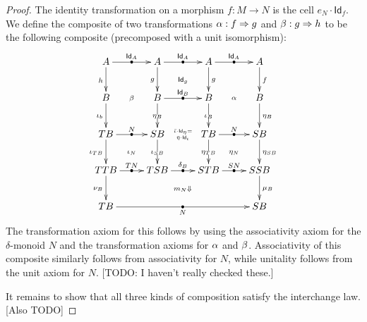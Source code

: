 \documentclass{amsart}
\let\tc\cdot
\newcommand{\hunit}[1]{\Id_{#1}}
\newcommand{\Tmult}{\nu}
\newcommand{\Tunit}{\iota}
\newcommand{\Smult}{\mu}
\newcommand{\Sunit}{\eta}
\newcommand{\dl}{\delta}
\newcommand{\Tdlunit}{\bar\Tunit}%
\newcommand{\Sdlunit}{\bar\Sunit}%
\newcommand{\Id}{\mathsf{Id}}
\begin{document}
\begin{proof}
  The identity transformation on a morphism $f:M\to N$ is the cell $e_N \tc \hunit{f}$.
  We define the composite of two transformations $\alpha:f\Rightarrow g$ and $\beta:g\Rightarrow h$ to be the following composite (precomposed with a unit isomorphism):
  \[
  \xymatrix{
    A \ar[d]_h \ar[r]|{\bullet}^{\hunit A} \ar@{}[ddr]|{\beta} &
    A \ar[d]_g \ar[r]|{\bullet}^{\hunit A} \ar@{}[dr]|{\hunit g} &
    A \ar[d]^g \ar[r]|{\bullet}^{\hunit A} \ar@{}[ddr]|{\alpha} &
    A\ar[d]^f \\
    B \ar[d]_{\Tunit_b} &
    B \ar[d]|{\Sunit_B} \ar@{}[ddr]|{\Tdlunit \tc \hunit{\Sunit} =\atop \Sdlunit \tc \hunit{\Tunit}} \ar[r]|{\bullet}^{\hunit B} &
    B \ar[d]|{\Tunit_B} & 
    B\ar[d]^{\Sunit_B}\\
    T B \ar[d]_{\Tunit_{TB}} \ar[r]|{\bullet}^N \ar@{}[dr]|{\Tunit_N} &
    S B \ar[d]|{\Tunit_{SB}} &
    T B \ar[d]|{\Sunit_{TB}} \ar[r]|{\bullet}^N \ar@{}[dr]|{\Sunit_N} &
    S B \ar[d]^{\Sunit_{SB}} \\
    T T B \ar[r]|{\bullet}^{T N} \ar[d]_{\Tmult_B} \ar@{}[drrr]|{m_N\Downarrow} &
    T S B \ar[r]|{\bullet}^{\dl_B} & S T B \ar[r]|{\bullet}^{S N} & S S B \ar[d]^{\Smult_B}\\
    T B \ar[rrr]|{\bullet}_N &&& S B
    }
  \]
  The transformation axiom for this follows by using the associativity axiom for the $\dl$-monoid $N$ and the transformation axioms for $\alpha$ and $\beta$.
  Associativity of this composite similarly follows from associativity for $N$, while unitality follows from the unit axiom for $N$.
  [TODO: I haven't really checked these.]

  It remains to show that all three kinds of composition satisfy the interchange law.
  [Also TODO]
\end{proof}
\end{document}
